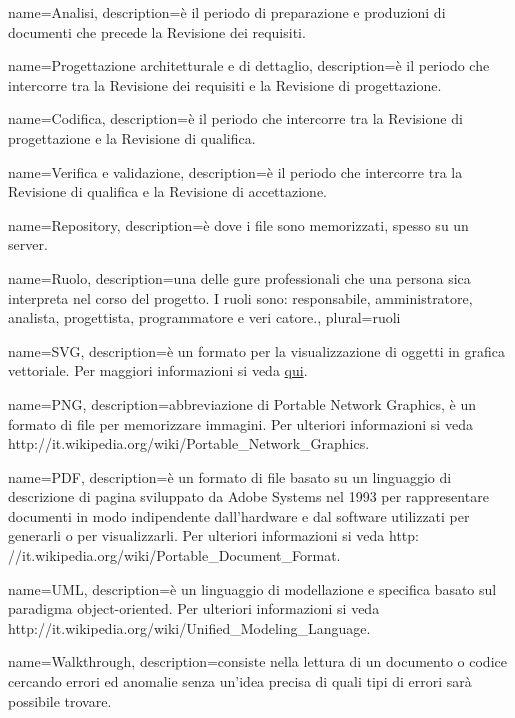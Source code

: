 {
	name=Analisi,
	description={è il periodo di preparazione e produzioni di documenti che precede la Revisione dei requisiti.}
}

 {
	name=Progettazione architetturale e di dettaglio,
	description={è il periodo che intercorre tra la Revisione dei requisiti e la Revisione di progettazione.}
}

 {
	name=Codifica,
	description={è il periodo che intercorre tra la Revisione di progettazione e la Revisione di qualifica.}
}

 {
	name=Verifica e validazione,
	description={è il periodo che intercorre tra la Revisione di qualifica e la Revisione di accettazione.}
}

 {
	name=Repository,
	description={è dove i file sono memorizzati, spesso su un server.}
}

 {
	name=Ruolo,
	description={una delle  gure professionali che una persona  sica interpreta nel corso del progetto. I ruoli sono: responsabile, amministratore, analista, progettista, programmatore e veri catore.},
    plural=ruoli
}

 {
	name=SVG,
	description={è un formato per la visualizzazione di oggetti in grafica vettoriale. Per maggiori informazioni si veda \href{https://it.wikipedia.org/wiki/Scalable_Vector_Graphics}{qui}.}
}

 {
	name=PNG,
	description={abbreviazione di Portable Network Graphics, è un formato di file per memorizzare immagini. Per ulteriori informazioni si veda http://it.wikipedia.org/wiki/Portable_Network_Graphics.}
}

 {
	name=PDF,
	description={è un formato di file basato su un linguaggio di descrizione di pagina sviluppato da Adobe Systems nel 1993 per rappresentare documenti in modo indipendente dall’hardware e dal software utilizzati per generarli o per visualizzarli. Per ulteriori informazioni si veda http: //it.wikipedia.org/wiki/Portable_Document_Format.}
}

 {
	name=UML,
	description={è un linguaggio di modellazione e specifica basato sul paradigma object-oriented. Per ulteriori informazioni si veda http://it.wikipedia.org/wiki/Unified_Modeling_Language.}
}

 {
	name=Walkthrough,
    description={consiste nella lettura di un documento o codice cercando errori ed anomalie senza un'idea precisa di quali tipi di errori sarà possibile trovare.}
}

